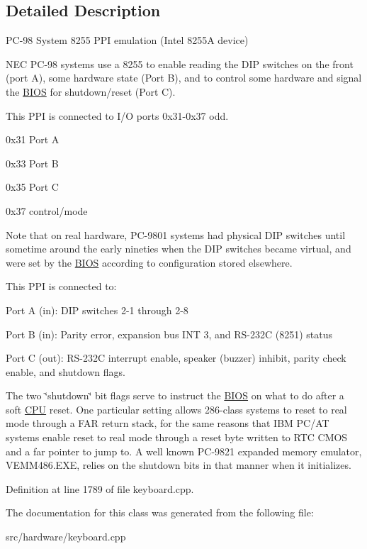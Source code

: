 \subsection{Detailed Description}
P\-C-\/98 System 8255 P\-P\-I emulation (Intel 8255\-A device) 

N\-E\-C P\-C-\/98 systems use a 8255 to enable reading the D\-I\-P switches on the front (port A), some hardware state (Port B), and to control some hardware and signal the \hyperlink{classBIOS}{B\-I\-O\-S} for shutdown/reset (Port C).

This P\-P\-I is connected to I/\-O ports 0x31-\/0x37 odd.
\begin{DoxyItemize}
\item 0x31 Port A
\item 0x33 Port B
\item 0x35 Port C
\item 0x37 control/mode
\end{DoxyItemize}

Note that on real hardware, P\-C-\/9801 systems had physical D\-I\-P switches until sometime around the early nineties when the D\-I\-P switches became virtual, and were set by the \hyperlink{classBIOS}{B\-I\-O\-S} according to configuration stored elsewhere.

This P\-P\-I is connected to\-:
\begin{DoxyItemize}
\item Port A (in)\-: D\-I\-P switches 2-\/1 through 2-\/8
\item Port B (in)\-: Parity error, expansion bus I\-N\-T 3, and R\-S-\/232\-C (8251) status
\item Port C (out)\-: R\-S-\/232\-C interrupt enable, speaker (buzzer) inhibit, parity check enable, and shutdown flags.
\end{DoxyItemize}

The two \char`\"{}shutdown\char`\"{} bit flags serve to instruct the \hyperlink{classBIOS}{B\-I\-O\-S} on what to do after a soft \hyperlink{classCPU}{C\-P\-U} reset. One particular setting allows 286-\/class systems to reset to real mode through a F\-A\-R return stack, for the same reasons that I\-B\-M P\-C/\-A\-T systems enable reset to real mode through a reset byte written to R\-T\-C C\-M\-O\-S and a far pointer to jump to. A well known P\-C-\/9821 expanded memory emulator, V\-E\-M\-M486.\-E\-X\-E, relies on the shutdown bits in that manner when it initializes. 

Definition at line 1789 of file keyboard.\-cpp.



The documentation for this class was generated from the following file\-:\begin{DoxyCompactItemize}
\item 
src/hardware/keyboard.\-cpp\end{DoxyCompactItemize}
